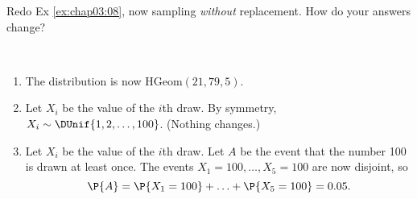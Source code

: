 \begin{exercise}
	Redo Ex \ref{ex:chap03:08}, now sampling \emph{without} replacement. How do your answers change?
 	\begin{solution}~
 		\begin{enumerate}
	 		\item The distribution is now $\text{HGeom}(21, 79, 5)$.
	 		\item Let $X_i$ be the value of the $i$th draw. By symmetry, $X_i \sim \DUnif{1, 2, \ldots, 100}$. (Nothing changes.)
	 		\item Let $X_i$ be the value of the $i$th draw. Let $A$ be the event that the number 100 is drawn at least once. The events $X_1 = 100, \ldots, X_5 = 100$ are now disjoint, so
	 			\begin{equation*}
	 				\P{A} = \P{X_1 = 100} + \hdots + \P{X_5 = 100} = 0.05.
	 			\end{equation*}
	 	\end{enumerate}
 	\end{solution}
\end{exercise}
 	
